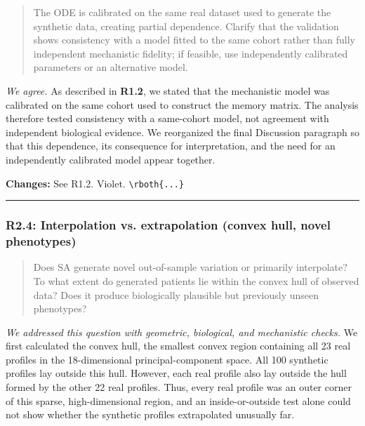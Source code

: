\documentclass[
  11pt,
  letterpaper,
]{article}
\begin{document}
\begin{quote}
The ODE is calibrated on the same real dataset used to generate the synthetic data, creating partial dependence. Clarify that the validation shows consistency with a model fitted to the same cohort rather than fully independent mechanistic fidelity; if feasible, use independently calibrated parameters or an alternative model.
\end{quote}

\emph{We agree.} As described in \textbf{R1.2}, we stated that the mechanistic model was calibrated on the same cohort used to construct the memory matrix. The analysis therefore tested consistency with a same-cohort model, not agreement with independent biological evidence. We reorganized the final Discussion paragraph so that this dependence, its consequence for interpretation, and the need for an independently calibrated model appear together.

\textbf{Changes:} See R1.2. Violet. \texttt{\textbackslash{}rboth\{...\}}

\begin{center}\rule{0.5\linewidth}{0.5pt}\end{center}

\subsubsection{R2.4: Interpolation vs. extrapolation (convex hull, novel phenotypes)}\label{r24-interpolation-vs-extrapolation-convex-hull-novel-phenotypes}

\begin{quote}
Does SA generate novel out-of-sample variation or primarily interpolate? To what extent do generated patients lie within the convex hull of observed data? Does it produce biologically plausible but previously unseen phenotypes?
\end{quote}

\emph{We addressed this question with geometric, biological, and mechanistic checks.} We first calculated the convex hull, the smallest convex region containing all 23 real profiles in the 18-dimensional principal-component space. All 100 synthetic profiles lay outside this hull. However, each real profile also lay outside the hull formed by the other 22 real profiles. Thus, every real profile was an outer corner of this sparse, high-dimensional region, and an inside-or-outside test alone could not show whether the synthetic profiles extrapolated unusually far.
\end{document}
